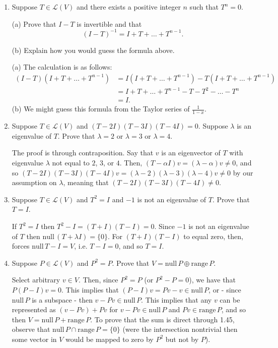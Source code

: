 \documentclass{book}
\begin{document}
\begin{enumerate}

\item Suppose \(T \in \mathcal{L}(V)\) and there exists a positive integer \(n\) such that \(T^n=0\).

(a) Prove that \(I-T\) is invertible and that \[(I-T)^{-1}=I+T+\dots+T^{n-1}.\]

(b) Explain how you would guess the formula above.

(a) The calculation is as follows:
\begin{align*}
(I-T)(I+T+\dots+T^{n-1}) &= I(I+T+\dots+T^{n-1})-T(I+T+\dots+T^{n-1}) \\
&= I+T+\dots+T^{n-1} -T-T^2-\dots-T^n \\
&= I.
\end{align*}
(b) We might guess this formula from the Taylor series of \(\frac{1}{1-x}\).

\item Suppose \(T \in \mathcal{L}(V)\) and \((T-2I)(T-3I)(T-4I)=0\).  Suppose \(\lambda\) is an eigenvalue of \(T\).  Prove that \(\lambda=2\) or \(\lambda=3\) or \(\lambda=4\).

The proof is through contraposition.  Say that \(v\) is an eigenvector of \(T\) with eigenvalue \(\lambda\) not equal to \(2\), \(3\), or \(4\).  Then, \((T-\alpha I)v=(\lambda-\alpha)v \neq 0\), and so \((T-2I)(T-3I)(T-4I)v=(\lambda-2)(\lambda-3)(\lambda-4)v \neq 0\) by our assumption on \(\lambda\), meaning that \((T-2I)(T-3I)(T-4I) \neq 0\).

\item Suppose \(T \in \mathcal{L}(V)\) and \(T^2=I\) and \(-1\) is not an eigenvalue of \(T\).  Prove that \(T=I\).

If \(T^2=I\) then \(T^2-I=(T+I)(T-I)=0\).  Since \(-1\) is not an eigenvalue of \(T\) then \(\text{null} \, (T+\lambda I)=\{0\}\).  For \((T+I)(T-I)\) to equal zero, then, forces \(\text{null} \, T-I=V\), i.e. \(T-I=0\), and so \(T=I\).

\item Suppose \(P \in \mathcal{L}(V)\) and \(P^2=P\).  Prove that \(V=\textrm{null} \, P \oplus \textrm{range} \, P\).


Select arbitrary \(v \in V\).  Then, since \(P^2=P\) (or \(P^2-P=0\)), we have that \(P(P-I)v=0\).  This implies that \((P-I)v=Pv-v \in \text{null} \, P\), or - since \(\text{null} \, P\) is a subspace - then \(v-Pv \in \text{null} \, P\).  This implies that any \(v\) can be represented as \((v-Pv)+Pv\) for \(v-Pv \in \text{null} \, P\) and \(Pv \in \text{range} \, P\), and so then \(V=\text{null} \, P + \text{range} \, P\).  To prove that the sum is direct through 1.45, observe that \(\text{null} \, P \cap \text{range} \, P = \{0\}\) (were the intersection nontrivial then some vector in \(V\) would be mapped to zero by \(P^2\) but not by \(P\)).


\end{enumerate}
\end{document}
